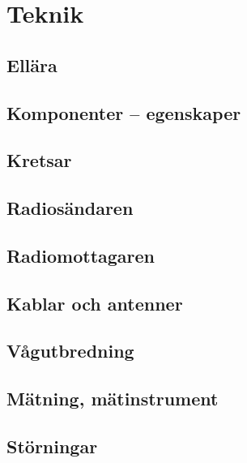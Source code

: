 \documentclass[10pt,openright]{report}
\begin{document}
\setlength{\parindent}{0pt}
\setlength{\parskip}{1ex plus 0.5ex minus 0.5ex}



\setcounter{part}{19}
\setcounter{chapter}{0}
\part{Teknik}

\chapter{Ellära}


\chapter{Komponenter -- egenskaper}


\chapter{Kretsar}


\chapter{Radiosändaren}


\chapter{Radiomottagaren}


\chapter{Kablar och antenner}


\chapter{Vågutbredning}


\chapter{Mätning, mätinstrument}


\chapter{Störningar}

\end{document}
